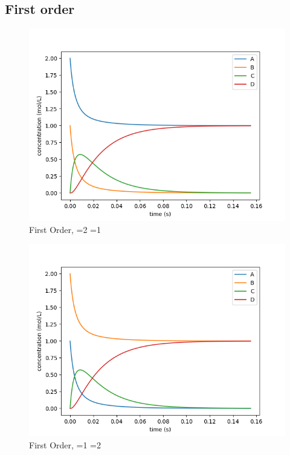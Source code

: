 \documentclass{article}
\begin{document}
\subsection{First order}
\begin{figure}[H]
\centering
\includegraphics[scale=0.6]{1. first 2 1.png}
\caption{First Order, =2 =1}
\end{figure}
\begin{figure}[H]
\centering
\includegraphics[scale=0.6]{1. first 1 2.png}
\caption{First Order, =1 =2}
\end{figure}
\end{document}
